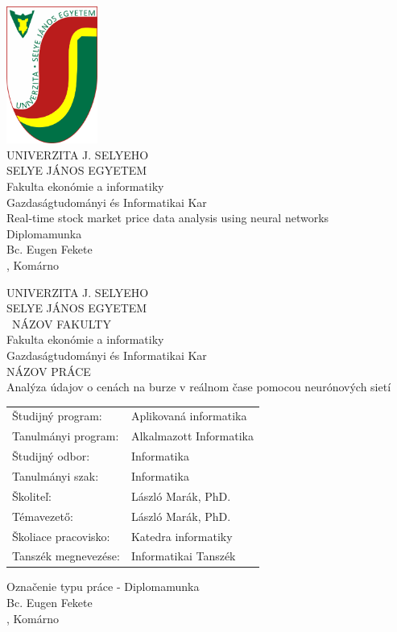 \documentclass[a4paper,oneside,onecolumn,12pt]{book}
\begin{document}
\thispagestyle{empty}
\begin{minipage}[c][\textheight][c]{\textwidth}
	{\centering
	\includegraphics[keepaspectratio,width=3cm]{SelyeBanner.png}\\
	\vskip0.5cm
	{\LARGE UNIVERZITA J. SELYEHO}\\
	\vskip0.5cm
	{\LARGE SELYE JÁNOS EGYETEM}\\
    \vskip0.5cm
	{\large Fakulta ekonómie a informatiky}\\
	\vskip0.5cm
	{\large Gazdaságtudományi és Informatikai Kar}\\
	\vfill
	{\Huge Real-time stock market price data analysis using neural networks}\\
	Diplomamunka\\
	Bc. Eugen Fekete \\
	\hfill\the\year{}, Komárno\hfill
	}
\end{minipage}
\begingroup
\makeatletter
\begin{minipage}[c][\textheight-1cm][c]{\textwidth}
	{\centering
	{\large UNIVERZITA J. SELYEHO\\SELYE JÁNOS EGYETEM}\\
	\vskip0.5cm
	{\ NÁZOV FAKULTY\\Fakulta ekonómie a informatiky\\Gazdaságtudományi és Informatikai Kar}\\
	\vfill
	{\Large NÁZOV PRÁCE\\Analýza údajov o cenách na burze v reálnom čase pomocou neurónových sietí }\\
	\vfill
	\begin{tabular}{ll}
		Študijný program:    & Aplikovaná informatika \\
		Tanulmányi program:  & Alkalmazott Informatika\\
		Študijný odbor:      & Informatika\\
		Tanulmányi szak:     & Informatika\\
		Školiteľ:            & László Marák, PhD.\\
		Témavezető:          & László Marák, PhD.\\
		Školiace pracovisko: & Katedra informatiky\\
		Tanszék megnevezése: & Informatikai Tanszék\\
	\end{tabular}
	\vfill
	Označenie typu práce - Diplomamunka\\
	Bc. Eugen Fekete\\
	\hfill\the\year{}, Komárno\hfill
	}
	\thispagestyle{empty}
\end{minipage}
\end{document}
